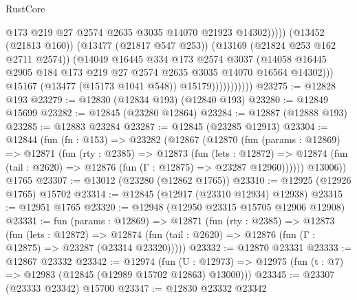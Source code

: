 \begin{lexlean}{RustCore}
\begin{coremodule}
                                      @173
                                      @219
                                      @27
                                      @2574
                                      @2635
                                      @3035
                                      @14070
                                      @21923
                                      @14302)))))
                            (@13452 (@21813 @160))
                            (@13477 (@21817 @547 @253))
                            (@13169 (@21824 @253 @162 @2711 @2574))
                            (@14049
                              @16445
                              @334
                              @173
                              @2574
                              @3037
                              (@14058
                                @16445
                                @2905
                                @184
                                @173
                                @219
                                @27
                                @2574
                                @2635
                                @3035
                                @14070
                                @16564
                                @14302)))
                          @15167
                          (@13477 (@15173 @1041 @548))
                          @15179)))))))))))
@23275 := @12828 @193
@23279 := @12830 (@12834 @193) (@12840 @193)
@23280 := @12849 @15699
@23282 := @12845 (@23280 @12864)
@23284 := @12887 (@12888 @193)
@23285 := @12883 @23284
@23287 := @12845 (@23285 @12913)
@23304 := @12844
    (fun (fn : @153) =>
    @23282
      (@12867
        (@12870
          (fun (params : @12869) =>
          @12871
            (fun (rty : @2385) =>
            @12873
              (fun (lets : @12872) =>
              @12874 (fun (tail : @2620) => @12876 (fun (Γ : @12875) => @23287 @12960))))))
        @13006))
    @1765
@23307 := @13012 (@23280 (@12862 @1765))
@23310 := @12925 (@12926 @1765) @15702
@23314 := @12845 (@12917 (@23310 @12934) @12938)
@23315 := @12951 @1765
@23320 := @12948 (@12950 @23315 @15705 @12906 @12908)
@23331 := fun (params : @12869) =>
  @12871
    (fun (rty : @2385) =>
    @12873
      (fun (lets : @12872) =>
      @12874 (fun (tail : @2620) => @12876 (fun (Γ : @12875) => @23287 (@23314 @23320)))))
@23332 := @12870 @23331
@23333 := @12867 @23332
@23342 := @12974
    (fun (U : @12973) => @12975 (fun (t : @7) => @12983 (@12845 (@12989 @15702 @12863) @13000)))
@23345 := @23307 (@23333 @23342) @15700
@23347 := @12830 @23332 @23342

\end{coremodule}
\end{lexlean}
